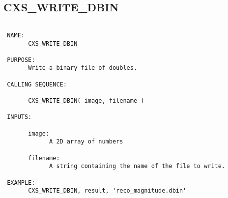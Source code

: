 \subsection{CXS\_WRITE\_DBIN}
\begin{verbatim}

 NAME:
       CXS_WRITE_DBIN

 PURPOSE:
       Write a binary file of doubles. 

 CALLING SEQUENCE:

       CXS_WRITE_DBIN( image, filename )

 INPUTS:

       image:
             A 2D array of numbers

       filename:
             A string containing the name of the file to write.

 EXAMPLE:
       CXS_WRITE_DBIN, result, 'reco_magnitude.dbin'

\end{verbatim}

